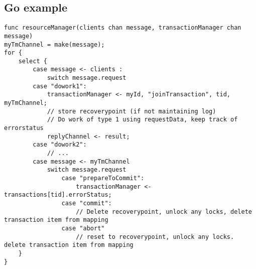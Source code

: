 \subsection{Go example}
\begin{verbatim}
func resourceManager(clients chan message, transactionManager chan message)
myTmChannel = make(message);
for {
	select {
		case message <- clients :
			switch message.request
		case "dowork1":
			transactionManager <- myId, "joinTransaction", tid, myTmChannel;
			// store recoverypoint (if not maintaining log)
			// Do work of type 1 using requestData, keep track of errorstatus
			replyChannel <- result;
		case "dowork2":
			// ...
		case message <- myTmChannel
			switch message.request
				case "prepareToCommit":
					transactionManager <- transactions[tid].errorStatus;
				case "commit":
					// Delete recoverypoint, unlock any locks, delete transaction item from mapping
				case "abort"
					// reset to recoverypoint, unlock any locks. delete transaction item from mapping
	}
}
\end{verbatim}